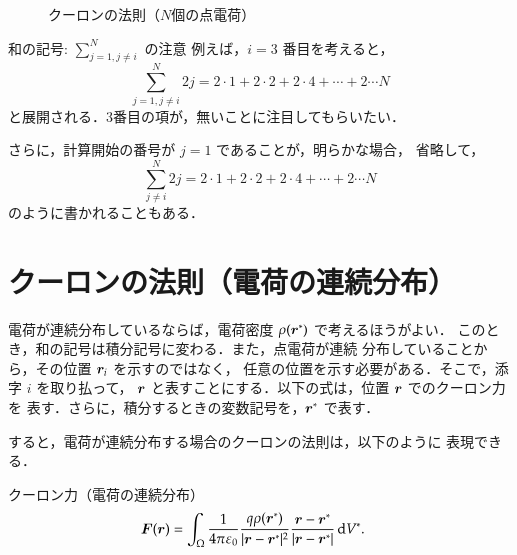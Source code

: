        \begin{figure}[hbt]
            \begin{center}
                \caption{クーロンの法則（$N$個の点電荷）}
                \label{fig:EM_CoulombN}
            \end{center}
        \end{figure}

        \begin{memo}{和の記号: $\sum_{j=1,j\neq i}^{N}$ の注意}
            例えば，$i=3$ 番目を考えると，
                \begin{equation*}
                    \sum_{j=1,j\neq i}^{N} 2j
                    = 2 \cdot 1 +  2 \cdot 2 + 2 \cdot 4 + \cdots + 2 \cdots N
                \end{equation*}
            と展開される．3番目の項が，無いことに注目してもらいたい．

            さらに，計算開始の番号が $j=1$ であることが，明らかな場合，
            省略して，
                \begin{equation*}
                    \sum_{j\neq i}^{N} 2j
                    = 2 \cdot 1 +  2 \cdot 2 + 2 \cdot 4 + \cdots + 2 \cdots N
                \end{equation*}
            のように書かれることもある．
        \end{memo}


    \section{クーロンの法則（電荷の連続分布）}
    電荷が連続分布しているならば，電荷密度 $\rho(\boldsymbol{r}^{*})$ で考えるほうがよい．
    このとき，和の記号は積分記号に変わる．また，点電荷が連続
    分布していることから，その位置 $\boldsymbol{r}_{i}$ を示すのではなく，
    任意の位置を示す必要がある．そこで，添字 $i$ を取り払って，
    $\boldsymbol{r}$ と表すことにする．以下の式は，位置 $\boldsymbol{r}$ でのクーロン力を
    表す．さらに，積分するときの変数記号を，$\boldsymbol{r}^{*}$ で表す．

    すると，電荷が連続分布する場合のクーロンの法則は，以下のように
    表現できる．
    \begin{myshadebox}{クーロン力（電荷の連続分布）}
        \begin{align}\label{coulomb'slow2}
            \bF(\br)
            &=\int_\Omega \frac{1}{4\pi\varepsilon_{0}}
            \frac{q\rho(\br^{*})}{|\br-\br^{*}|^{2}}
            \frac{\br-\br^{*}}
                 {|\br-\br^{*}|}\df V^{*}.
        \end{align}
    \end{myshadebox}

